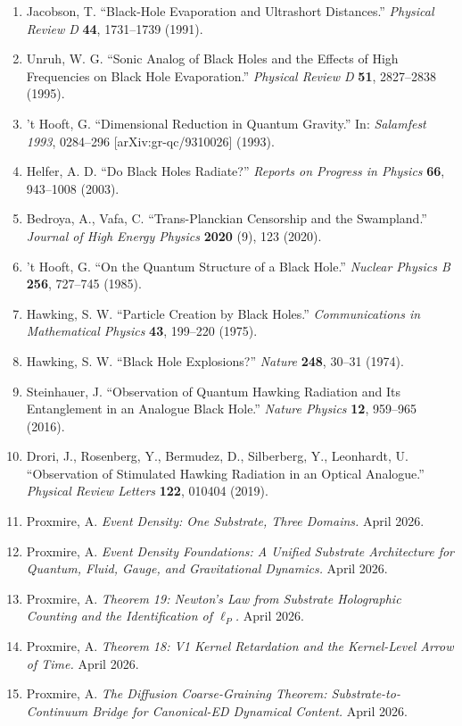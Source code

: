 \documentclass[11pt,a4paper]{article}
\begin{document}
\begin{enumerate}[noitemsep,leftmargin=*]
\item Jacobson, T. ``Black-Hole Evaporation and Ultrashort Distances.'' \textit{Physical Review D} \textbf{44}, 1731--1739 (1991).
\item Unruh, W. G. ``Sonic Analog of Black Holes and the Effects of High Frequencies on Black Hole Evaporation.'' \textit{Physical Review D} \textbf{51}, 2827--2838 (1995).
\item 't Hooft, G. ``Dimensional Reduction in Quantum Gravity.'' In: \textit{Salamfest 1993}, 0284--296 [arXiv:gr-qc/9310026] (1993).
\item Helfer, A. D. ``Do Black Holes Radiate?'' \textit{Reports on Progress in Physics} \textbf{66}, 943--1008 (2003).
\item Bedroya, A., Vafa, C. ``Trans-Planckian Censorship and the Swampland.'' \textit{Journal of High Energy Physics} \textbf{2020} (9), 123 (2020).
\item 't Hooft, G. ``On the Quantum Structure of a Black Hole.'' \textit{Nuclear Physics B} \textbf{256}, 727--745 (1985).
\item Hawking, S. W. ``Particle Creation by Black Holes.'' \textit{Communications in Mathematical Physics} \textbf{43}, 199--220 (1975).
\item Hawking, S. W. ``Black Hole Explosions?'' \textit{Nature} \textbf{248}, 30--31 (1974).
\item Steinhauer, J. ``Observation of Quantum Hawking Radiation and Its Entanglement in an Analogue Black Hole.'' \textit{Nature Physics} \textbf{12}, 959--965 (2016).
\item Drori, J., Rosenberg, Y., Bermudez, D., Silberberg, Y., Leonhardt, U. ``Observation of Stimulated Hawking Radiation in an Optical Analogue.'' \textit{Physical Review Letters} \textbf{122}, 010404 (2019).
\item Proxmire, A. \textit{Event Density: One Substrate, Three Domains.} April 2026.
\item Proxmire, A. \textit{Event Density Foundations: A Unified Substrate Architecture for Quantum, Fluid, Gauge, and Gravitational Dynamics.} April 2026.
\item Proxmire, A. \textit{Theorem 19: Newton's Law from Substrate Holographic Counting and the Identification of $\ell_P$.} April 2026.
\item Proxmire, A. \textit{Theorem 18: V1 Kernel Retardation and the Kernel-Level Arrow of Time.} April 2026.
\item Proxmire, A. \textit{The Diffusion Coarse-Graining Theorem: Substrate-to-Continuum Bridge for Canonical-ED Dynamical Content.} April 2026.

\end{enumerate}
\end{document}

